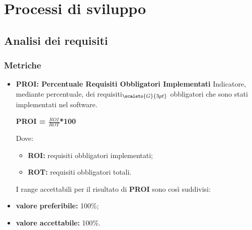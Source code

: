 \section{Processi di sviluppo}\label{QualitàDelProcessoProcessiDiSviluppo}
\subsection{Analisi dei requisiti}\label{ProcessiDiSviluppoAnalisiDeiRequisiti}
\subsubsection{Metriche}\label{MetricheProcessiDiSviluppo}
\begin{itemize}
	\item[] \textbf{PROI: Percentuale Requisiti Obbligatori Implementati}
	Indicatore, mediante percentuale, dei requisiti$_{\scaleto{G}{3pt}}$ obbligatori che sono stati implementati nel software.
	\begin{center}
		\textbf{PROI = $\frac{ROI}{ROT}$*100}
	\end{center}
	Dove:
	\begin{itemize}
		\item \textbf{ROI:} requisiti obbligatori implementati;
		\item \textbf{ROT:} requisiti obbligatori totali.
	\end{itemize}
	I range accettabili per il risultato di \textbf{PROI} sono così suddivisi:
	\item \textbf{valore preferibile:} 100\%;
	\item \textbf{valore accettabile:} 100\%.
\end{itemize}
